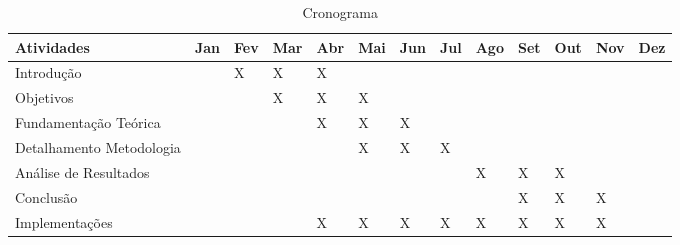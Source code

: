 \begin{table}[h]
\centering
 \caption{Cronograma}
 \setlength{\belowcaptionskip}{8pt}
 \begin{tabular}{|>{\centering\arraybackslash}m{3.0cm}|>{\centering\arraybackslash}m{0.7cm}|>{\centering\arraybackslash}m{0.7cm}|>{\centering\arraybackslash}m{0.7cm}|>{\centering\arraybackslash}m{0.7cm}|>{\centering\arraybackslash}m{0.7cm}|>{\centering\arraybackslash}m{0.7cm}|>{\centering\arraybackslash}m{0.7cm}|>{\centering\arraybackslash}m{0.7cm}|>{\centering\arraybackslash}m{0.7cm}|>{\centering\arraybackslash}m{0.7cm}|>{\centering\arraybackslash}m{0.7cm}|>{\centering\arraybackslash}m{0.7cm}|}

 
 \hline
\textbf{Atividades} &  \textbf{Jan} &  \textbf{Fev}&  \textbf{Mar}&  \textbf{Abr}&  \textbf{Mai}&  \textbf{Jun}&  \textbf{Jul}&  \textbf{Ago}&  \textbf{Set}&  \textbf{Out}&  \textbf{Nov}&  \textbf{Dez} \\
\hline
\hline
Introdução  & &X &X &X & & & & & & & &  \\
\hline
Objetivos  & & & X&X &X & & & & & & &  \\
\hline
Fundamentação Teórica  & & & &X &X & X& & & & & &  \\
\hline
Detalhamento Metodologia  & & & & &X &X &X & & & & &  \\
\hline
Análise de Resultados  & & & & & & & &X & X&X & &  \\
\hline
Conclusão  & & & & & & & & & X& X& X&  \\
\hline
Implementações  & & & &X &X &X & X& X& X& X& X&  \\
\hline
\hline	

\end{tabular}\\
  \label{tab:redesmundoreal}
\end{table}